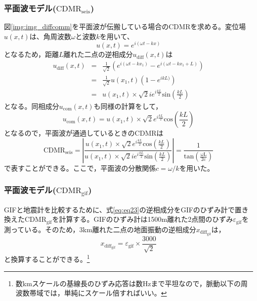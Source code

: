 \subsubsection{平面波モデル($\mathrm{CDMR_{seis}}$)}
図\ref{img:img_diffcomm}を平面波が伝搬している場合のCDMRを求める。変位場$u(x,t)$は、角周波数$\omega$と波数$k$を用いて、
\begin{equation}
  u(x,t) = e^{i(\omega{t}-k{x})}
\end{equation}
となるため，距離$L$離れた二点の逆相成分$u_{\mathrm{diff}}(x,t)$は
\begin{eqnarray}
  u_{\mathrm{diff}}(x,t) &=& \frac{1}{\sqrt{2}}\left( e^{i(\omega{t}-k{x_1})} -e^{i(\omega{t}-k{x_1+L})} \right)\\
  &=& \frac{1}{\sqrt{2}}u(x_1,t)\left( 1-e^{ikL)}  \right)\\
  &=& u(x_1,t)\times{\sqrt{2}{i}}e^{i\frac{kL}{2}}\mathrm{sin}(\frac{kL}{2})
\end{eqnarray}
となる。同相成分$u_\mathrm{com}(x,t)$も同様の計算をして，
\begin{equation}
  u_{\mathrm{com}}(x,t) = u(x_1,t)\times{\sqrt{2}}e^{i\frac{kL}{2}}\mathrm{cos}(\frac{kL}{2})
\end{equation}
となるので，平面波が通過しているときの$\mathrm{CDMR}$は
\begin{equation}
  \boxed{\mathrm{CDMR_{seis}} = \left| \frac{u(x_1,t)\times{\sqrt{2}}e^{i\frac{kL}{2}}\mathrm{cos}(\frac{kL}{2})}{u(x_1,t)\times{\sqrt{2}{i}}e^{i\frac{kL}{2}}\mathrm{sin}(\frac{kL}{2})}  \right| = \frac{1}{\mathrm{tan\left( \frac{\omega{L}}{2c}  \right)}}}
  \label{eq:eq18}
\end{equation}
で表すことができる。ここで，平面波の分散関係$c=\omega/k$を用いた。


\subsubsection{平面波モデル($\mathrm{CDMR_{gif}}$)}
GIFと地震計を比較するために、式\ref{eq:eq23}の逆相成分をGIFのひずみ計で置き換えた$\mathrm{CDMR_{gif}}$を計算する。GIFのひずみ計は1500m離れた2点間のひずみ$\varepsilon_{\mathrm{gif}}$を測っている。そのため，3km離れた二点の地面振動の逆相成分$x_{\mathrm{diff_{gif}}}$は，
\begin{equation}
  x_{\mathrm{diff_{gif}}} = \varepsilon_{\mathrm{gif}}\times \frac{3000}{\sqrt{2}}\label{eq:eq34} 
\end{equation}
と換算することができる。\footnote[5]{数kmスケールの基線長のひずみ応答は数Hzまで平坦なので，脈動以下の周波数帯域では，単純にスケール倍すればいい。}


